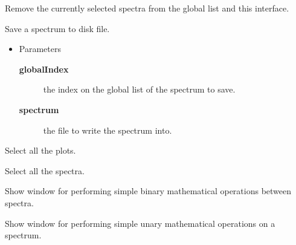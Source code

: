 \begin{desc}Remove the currently selected spectra from the global list and
 this interface.
\end{desc}

\begin{desc}Save a spectrum to disk file.
\begin{itemize}
\item{Parameters
  \begin{description}
   \item[\textbf{globalIndex}]{the index on the global list of the spectrum
                    to save.}
   \item[\textbf{spectrum}]{the file to write the spectrum into.}
  \end{description}}
\end{itemize}
\end{desc}

\begin{desc}Select all the plots.
\end{desc}

\begin{desc}Select all the spectra.
\end{desc}

\begin{desc}Show window for performing simple binary mathematical
 operations between spectra.
\end{desc}

\begin{desc}Show window for performing simple unary mathematical
 operations on a spectrum.
\end{desc}


